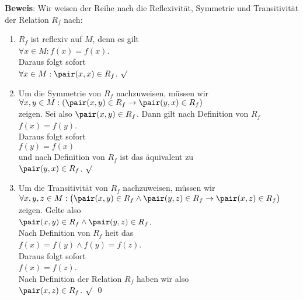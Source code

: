 \noindent
\textbf{Beweis}: Wir weisen der Reihe nach die Reflexivit\"{a}t, Symmetrie und Transitivit\"{a}t der Relation $R_f$ nach:
\begin{enumerate}
\item $R_f$ ist reflexiv auf $M$, denn es gilt 
      \\[0.2cm]
      \hspace*{1.3cm}
      $\forall x \in M: f(x) = f(x)$.
      \\[0.2cm]
      Daraus folgt sofort 
      \\[0.2cm]
      \hspace*{1.3cm}
      $\forall x \in M: \pair(x,x) \in R_f$. $\surd$
\item Um die Symmetrie von $R_f$ nachzuweisen, m\"{u}ssen wir
      \\[0.2cm]
      \hspace*{1.3cm}
      $\forall x,y \in M: (\pair(x,y) \in R_f \rightarrow \pair(y,x) \in R_f)$
      \\[0.2cm]
      zeigen.  Sei also $\pair(x,y) \in R_f$. Dann gilt nach Definition von $R_f$
      \\[0.2cm]
      \hspace*{1.3cm}
      $f(x) = f(y)$.
      \\[0.2cm]
      Daraus folgt sofort 
      \\[0.2cm]
      \hspace*{1.3cm}
      $f(y) = f(x)$
      \\[0.2cm]
      und nach Definition von $R_f$ ist das \"{a}quivalent zu 
      \\[0.2cm]
      \hspace*{1.3cm}
      $\pair(y,x) \in R_f$. $\surd$
\item Um die Transitivit\"{a}t von $R_f$ nachzuweisen, m\"{u}ssen wir 
      \\[0.2cm]
      \hspace*{1.3cm}
      $\forall x,y,z \in M: \bigl(\pair(x,y) \in R_f \wedge \pair(y,z) \in R_f \rightarrow 
                            \pair(x,z) \in R_f\bigr)
      $
      \\[0.2cm]
      zeigen.  Gelte also 
      \\[0.2cm]
      \hspace*{1.3cm}
      $\pair(x,y) \in R_f \wedge \pair(y,z) \in R_f$.
      \\[0.2cm]
      Nach Definition von $R_f$ hei\3t das 
      \\[0.2cm]
      \hspace*{1.3cm}
      $f(x) = f(y) \wedge f(y) = f(z)$.
      \\[0.2cm]
      Daraus folgt sofort 
      \\[0.2cm]
      \hspace*{1.3cm}
      $f(x) = f(z)$.
      \\[0.2cm]
      Nach Definition der Relation $R_f$ haben wir also 
      \\[0.2cm]
      \hspace*{1.3cm}
      $\pair(x,z) \in R_f$. $\surd$
      \qed
\end{enumerate}


